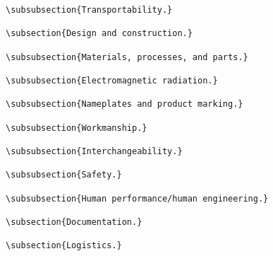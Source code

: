 \begin{itemize}
\begin{small}
\begin{verbatim}
\subsubsection{Transportability.}

\subsection{Design and construction.}

\subsubsection{Materials, processes, and parts.}

\subsubsection{Electromagnetic radiation.}

\subsubsection{Nameplates and product marking.}

\subsubsection{Workmanship.}

\subsubsection{Interchangeability.}

\subsubsection{Safety.}

\subsubsection{Human performance/human engineering.}

\subsection{Documentation.}

\subsection{Logistics.}


\end{verbatim}
\end{small}
\end{itemize}
